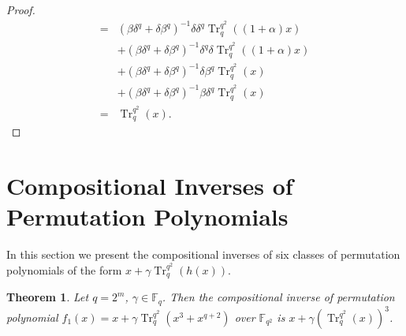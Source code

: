 \documentclass{birkjour}
\newtheorem{thm}{Theorem}[section]
\theoremstyle{definition}
\theoremstyle{remark}
\numberwithin{equation}{section}
\begin{document}
\begin{proof}
\begin{align*}
		=&(\beta\delta^{q}+\delta\beta^{q})^{-1}\delta\delta^{q}\operatorname{Tr}_{q}^{q^2}((1+\alpha)x)\\&+(\beta\delta^{q}+\delta\beta^{q})^{-1}\delta^{q}\delta\operatorname{Tr}_{q}^{q^2}((1+\alpha)x)\\&+(\beta\delta^{q}+\delta\beta^{q})^{-1}\delta\beta^{q}\operatorname{Tr}_{q}^{q^2}(x)\\&+(\beta\delta^{q}+\delta\beta^{q})^{-1}\beta\delta^{q}\operatorname{Tr}_{q}^{q^2}(x)\\
		=&\operatorname{Tr}_{q}^{q^2}(x).
	\end{align*}
\end{proof}
	\section{Compositional Inverses of Permutation Polynomials} 
	In this section we present the compositional inverses of six classes of permutation polynomials of the form $x+\gamma\operatorname{Tr}_q^{q^2}(h(x))$.
	\begin{thm} Let $q=2^m$, $\gamma\in \mathbb{F}_q$. Then the compositional inverse of permutation polynomial 
		$f_1(x)=x+\gamma\operatorname{Tr}_{q}^{q^2}(x^3+x^{q+2})$  over $\mathbb{F}_{q^2}$ is 
		$x+\gamma(\operatorname{Tr}_{q}^{q^2}(x))^3$.
	\end{thm}
\end{document}
